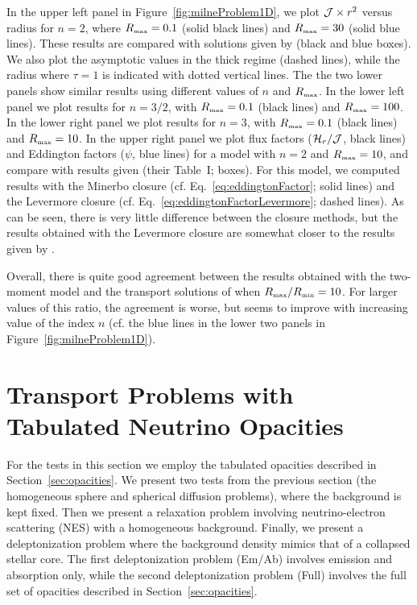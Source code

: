 \documentclass[10pt,preprint]{aastex}
\begin{document}
In the upper left panel in Figure~\ref{fig:milneProblem1D}, we plot $\mathcal{J}\times r^{2}$ versus radius for $n=2$, where $R_{\mbox{\tiny max}}=0.1$ (solid black lines) and $R_{\mbox{\tiny max}}=30$ (solid blue lines).  
These results are compared with solutions given by \citet{hummerRybicki_1971} (black and blue boxes).  
We also plot the asymptotic values in the thick regime (dashed lines), while the radius where $\tau=1$ is indicated with dotted vertical lines.  
The the two lower panels show similar results using different values of $n$ and $R_{\mbox{\tiny max}}$.  
In the lower left panel we plot results for $n=3/2$, with $R_{\mbox{\tiny max}}=0.1$ (black lines) and $R_{\mbox{\tiny max}}=100$.  
In the lower right panel we plot results for $n=3$, with $R_{\mbox{\tiny max}}=0.1$ (black lines) and $R_{\mbox{\tiny max}}=10$.  
In the upper right panel we plot flux factors ($\mathcal{H}_{r}/\mathcal{J}$, black lines) and Eddington factors ($\psi$, blue lines) for a model with $n=2$ and $R_{\mbox{\tiny max}}=10$, and compare with results given \citet{hummerRybicki_1971} (their Table~I; boxes).  
For this model, we computed results with the Minerbo closure (cf. Eq.~\eqref{eq:eddingtonFactor}; solid lines) and the Levermore closure (cf. Eq.~\eqref{eq:eddingtonFactorLevermore}; dashed lines).  
As can be seen, there is very little difference between the closure methods, but the results obtained with the Levermore closure are somewhat closer to the results given by \citet{hummerRybicki_1971}.  

Overall, there is quite good agreement between the results obtained with the two-moment model and the transport solutions of \citet{hummerRybicki_1971} when $R_{\mbox{\tiny max}}/R_{\mbox{\tiny min}}=10$.  
For larger values of this ratio, the agreement is worse, but seems to improve with increasing value of the index $n$ (cf. the blue lines in the lower two panels in Figure~\ref{fig:milneProblem1D}).  

\section{Transport Problems with Tabulated Neutrino Opacities}

For the tests in this section we employ the tabulated opacities described in Section~\ref{sec:opacities}.  
We present two tests from the previous section (the homogeneous sphere and spherical diffusion problems), where the background is kept fixed.  
Then we present a relaxation problem involving neutrino-electron scattering (NES) with a homogeneous background.  
Finally, we present a deleptonization problem where the background density mimics that of a collapsed stellar core.  
The first deleptonization problem (Em/Ab) involves emission and absorption only, while the second deleptonization problem (Full) involves the full set of opacities described in Section~\ref{sec:opacities}.  
\end{document}
